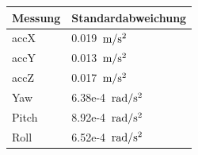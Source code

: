 \begin{table}[htpb] \centering
	\begin{tabular}{|l|l|}
		\hline
		Messung & Standardabweichung                                 \\ \hline
		accX    & 0.019 $\,\mathrm{m/s^2}$ \\ \hline
		accY    & 0.013 $\,\mathrm{m/s^2}$                                             \\ \hline
		accZ    & 0.017 $\,\mathrm{m/s^2}$                                             \\ \hline
		Yaw     & 6.38e-4  $\,\mathrm{rad/s^2}$                                          \\ \hline
		Pitch   & 8.92e-4  $\,\mathrm{rad/s^2}$                                             \\ \hline
		Roll    & 6.52e-4  $\,\mathrm{rad/s^2}$                                             \\ \hline
	\end{tabular}
\end{table}\\

\clearpage
